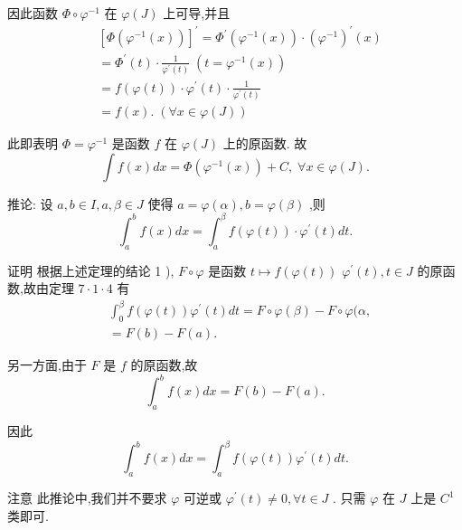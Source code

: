 因此函数 $\Phi  \circ  {\varphi }^{-1}$ 在 $\varphi \left( J\right)$ 上可导,并且
\begin{align*}
	&{\left\lbrack  \Phi \left( {\varphi }^{-1}\left( x\right) \right) \right\rbrack  }^{\prime } = {\Phi }^{\prime }\left( {{\varphi }^{-1}\left( x\right) }\right)  \cdot  {\left( {\varphi }^{-1}\right) }^{\prime }\left( x\right)\\
	&= {\Phi }^{\prime }\left( t\right)  \cdot  \frac{1}{{\varphi }^{\prime }\left( t\right) }\;\left( {t = {\varphi }^{-1}\left( x\right) }\right)\\
	&= f\left( {\varphi \left( t\right) }\right)  \cdot  {\varphi }^{\prime }\left( t\right)  \cdot  \frac{1}{{\varphi }^{\prime }\left( t\right) }\\
	&= f\left( x\right) .\;\left( {\forall x \in  \varphi \left( J\right) }\right)
\end{align*}

此即表明 $\Phi  = {\varphi }^{-1}$ 是函数 $f$ 在 $\varphi \left( J\right)$ 上的原函数. 故
$$\int f\left( x\right) {dx} = \Phi \left( {{\varphi }^{-1}\left( x\right) }\right)  + C,\;\forall x \in  \varphi \left( J\right) .$$

推论: 设 $a,b \in  I,a,\beta  \in  J$ 使得 $a = \varphi \left( \alpha \right) ,b = \varphi \left( \beta \right)$ ,则
$${\int }_{a}^{b}f\left( x\right) {dx} = {\int }_{a}^{\beta }f\left( {\varphi \left( t\right) }\right)  \cdot  {\varphi }^{\prime }\left( t\right) {dt}.$$

证明 根据上述定理的结论 1 ), $F \circ  \varphi$ 是函数 $t \mapsto  f\left( {\varphi \left( t\right) }\right)$  ${\varphi }^{\prime }\left( t\right) ,t \in  J$ 的原函数,故由定理 $7 \cdot  1 \cdot  4$ 有
\begin{align*}
	&{\int }_{0}^{\beta }f\left( {\varphi \left( t\right) }\right) {\varphi }^{\prime }\left( t\right) {dt} = F \circ  \varphi \left( \beta \right)  - F \circ  \varphi (\alpha ,\\
	&= F\left( b\right)  - F\left( a\right) .
\end{align*}

另一方面,由于 $F$ 是 $f$ 的原函数,故
$${\int }_{a}^{b}f\left( x\right) {dx} = F\left( b\right)  - F\left( a\right) .$$

因此
$${\int }_{a}^{b}f\left( x\right) {dx} = {\int }_{a}^{\beta }f\left( {\varphi \left( t\right) }\right) {\varphi }^{\prime }\left( t\right) {dt}.$$

注意 此推论中,我们并不要求 $\varphi$ 可逆或 ${\varphi }^{\prime }\left( t\right)  \neq  0,\forall t \in  J$ . 只需 $\varphi$ 在 $J$ 上是 ${C}^{1}$ 类即可.

